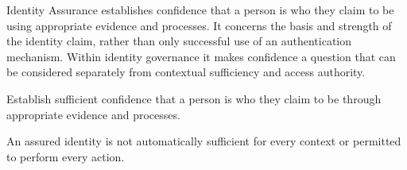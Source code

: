 Identity Assurance establishes confidence that a person is who they claim to be using appropriate evidence and processes. It concerns the basis and strength of the identity claim, rather than only successful use of an authentication mechanism. Within identity governance it makes confidence a question that can be considered separately from contextual sufficiency and access authority.



Establish sufficient confidence that a person is who they claim to be through appropriate evidence and processes.



An assured identity is not automatically sufficient for every context or permitted to perform every action.


